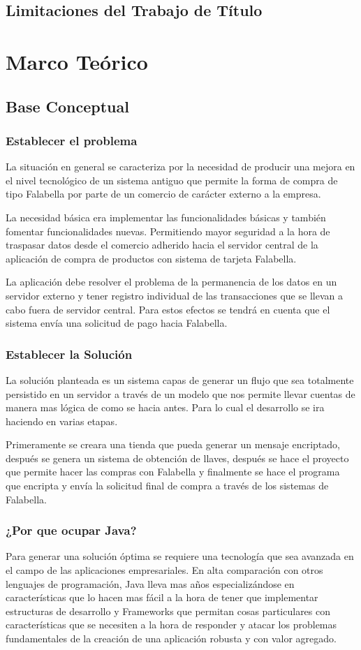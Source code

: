 \documentclass[a4paper,12pt,openany,oneside]{book}
\begin{document}
\section{Limitaciones del Trabajo de Título}

\chapter{Marco Teórico}
\thispagestyle{empty}
\section{Base Conceptual}
\subsection{Establecer el problema}
La situación en general se caracteriza por la necesidad de producir una mejora en el nivel tecnológico de un sistema antiguo que permite la forma de compra de tipo Falabella por parte de un comercio de carácter externo a la empresa. 

La necesidad básica era implementar las funcionalidades básicas y también fomentar funcionalidades nuevas. Permitiendo mayor seguridad a la hora de traspasar datos desde el comercio adherido hacia el servidor central de la aplicación de compra de productos con sistema de tarjeta Falabella.

La aplicación debe resolver el problema de la permanencia de los datos en un servidor externo y tener registro individual de las transacciones que se llevan a cabo fuera de servidor central. Para estos efectos  se tendrá en cuenta que el sistema envía una solicitud de pago hacia Falabella.
\subsection{Establecer la Solución}
La solución planteada es un sistema capas de generar un flujo que sea totalmente persistido en un servidor a través de un modelo que nos permite llevar cuentas de manera mas lógica de como se hacia antes. Para lo cual el desarrollo se ira haciendo en varias etapas.

Primeramente se creara una tienda que pueda generar un mensaje encriptado, después se genera un sistema de obtención de llaves, después se hace el proyecto que permite hacer las compras con Falabella y finalmente se hace el programa que encripta y envía la solicitud final de compra a través de los sistemas de Falabella.
\subsection{¿Por que ocupar Java?}
Para generar una solución óptima se requiere una tecnología que sea avanzada en el campo de las aplicaciones empresariales. En alta comparación con otros lenguajes de programación, Java lleva mas años especializándose en características que lo hacen mas fácil a la hora de tener que implementar estructuras de desarrollo y Frameworks que permitan cosas particulares con características que se necesiten a la hora de responder y atacar los problemas fundamentales de la creación de una aplicación robusta y con valor agregado.
\end{document}
